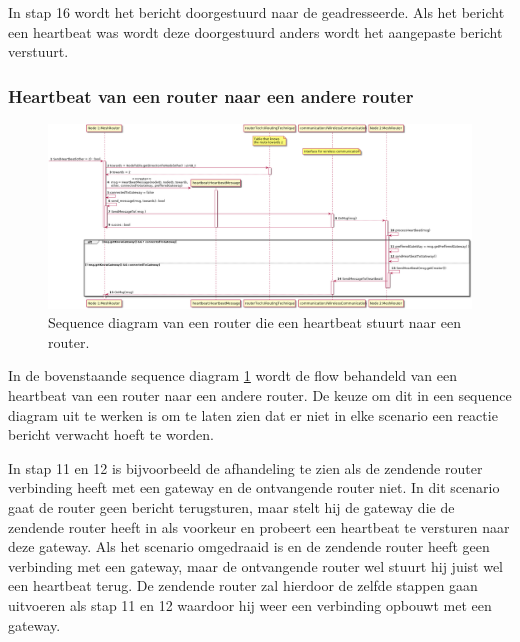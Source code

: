 \documentclass[a4paper, 11pt, oneside]{report}
\begin{document}
In stap 16 wordt het bericht doorgestuurd naar de geadresseerde.
Als het bericht een heartbeat was wordt deze doorgestuurd anders wordt het aangepaste bericht verstuurt.

\subsubsection{Heartbeat van een router naar een andere router}
\label{DetailedDesign:Communicatie:sequence:heartbeatrouter->router}
\begin{figure}[H]
	\begin{center}\includegraphics[width=\linewidth]{UML/out/Communication/Sequence/RouterHeartbeatRouter/RouterHeartbeatRouter.png}\end{center}
	\caption{Sequence diagram van een router die een heartbeat stuurt naar een router.}
	\label{fig:communication:sequence:sequence:router->router}
\end{figure}
In de bovenstaande sequence diagram \ref{fig:communication:sequence:sequence:router->router} wordt de flow behandeld van een heartbeat van een router naar een andere router.
De keuze om dit in een sequence diagram uit te werken is om te laten zien dat er niet in elke scenario een reactie bericht verwacht hoeft te worden.

In stap 11 en 12 is bijvoorbeeld de afhandeling te zien als de zendende router verbinding heeft met een gateway en de ontvangende router niet.
In dit scenario gaat de router geen bericht terugsturen, maar stelt hij de gateway die de zendende router heeft in als voorkeur en probeert een heartbeat te versturen naar deze gateway.    
Als het scenario omgedraaid is en de zendende router heeft geen verbinding met een gateway, maar de ontvangende router wel stuurt hij juist wel een heartbeat terug. 
De zendende router zal hierdoor de zelfde stappen gaan uitvoeren als stap 11 en 12 waardoor hij weer een verbinding opbouwt met een gateway.
\end{document}
